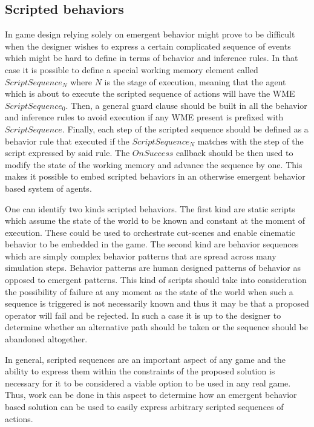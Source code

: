 \subsection{Scripted behaviors}

In game design relying solely on emergent behavior might prove to be difficult when the designer wishes to express a certain complicated sequence of events which might be hard to define in terms of behavior and inference rules.
In that case it is possible to define a special working memory element called $ScriptSequence_N$ where $N$ is the stage of execution, meaning that the agent which is about to execute the scripted sequence of actions will have the WME $ScriptSequence_0$.
Then, a general guard clause should be built in all the behavior and inference rules to avoid execution if any WME present is prefixed with $ScriptSequence$.
Finally, each step of the scripted sequence should be defined as a behavior rule that executed if the $ScriptSequence_N$ matches with the step of the script expressed by said rule.
The $OnSuccess$ callback should be then used to modify the state of the working memory and advance the sequence by one.
This makes it possible to embed scripted behaviors in an otherwise emergent behavior based system of agents.

One can identify two kinds scripted behaviors.
The first kind are static scripts which assume the state of the world to be known and constant at the moment of execution.
These could be used to orchestrate cut-scenes and enable cinematic behavior to be embedded in the game.
The second kind are behavior sequences which are simply complex behavior patterns that are spread across many simulation steps.
Behavior patterns are human designed patterns of behavior as opposed to emergent patterns.
This kind of scripts should take into consideration the possibility of failure at any moment as the state of the world when such a sequence is triggered is not necessarily known and thus it may be that a proposed operator will fail and be rejected.
In such a case it is up to the designer to determine whether an alternative path should be taken or the sequence should be abandoned altogether.

In general, scripted sequences are an important aspect of any game and the ability to express them within the constraints of the proposed solution is necessary for it to be considered a viable option to be used in any real game.
Thus, work can be done in this aspect to determine how an emergent behavior based solution can be used to easily express arbitrary scripted sequences of actions.